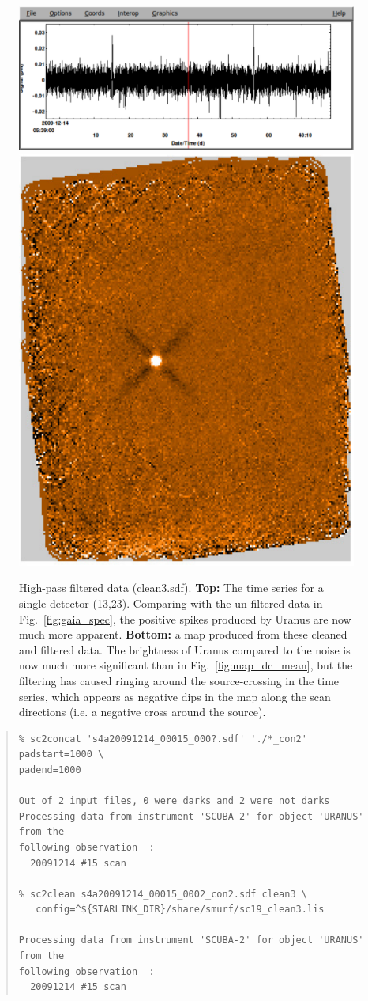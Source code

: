 \documentclass[twoside,11pt]{article}
\renewcommand{\_}{\texttt{\symbol{95}}}
\newenvironment{myquote}{\begin{quote}\begin{small}}{\end{small}\end{quote}}
\begin{document}
\begin{figure}
\begin{center}
\includegraphics[width=\linewidth]{sc19_spec_filt} \\
\vspace{0.3in}
\includegraphics[width=0.5\linewidth]{sc19_map_highpass}
\caption{High-pass filtered data (clean3.sdf). {\bf Top:} The time
  series for a single detector (13,23). Comparing with the un-filtered
  data in Fig.~\ref{fig:gaia_spec}, the positive spikes produced by
  Uranus are now much more apparent. {\bf Bottom:} a map produced from
  these cleaned and filtered data. The brightness of Uranus compared
  to the noise is now much more significant than in
  Fig.~\ref{fig:map_dc_mean}, but the filtering has caused ringing
  around the source-crossing in the time series, which appears as
  negative dips in the map along the scan directions (i.e. a negative
  cross around the source).}
\label{fig:highpass}
\end{center}
\end{figure}

\begin{myquote}
\begin{verbatim}
% sc2concat 's4a20091214_00015_000?.sdf' './*_con2' padstart=1000 \
padend=1000

Out of 2 input files, 0 were darks and 2 were not darks
Processing data from instrument 'SCUBA-2' for object 'URANUS' from the
following observation  :
  20091214 #15 scan

% sc2clean s4a20091214_00015_0002_con2.sdf clean3 \
   config=^${STARLINK_DIR}/share/smurf/sc19_clean3.lis

Processing data from instrument 'SCUBA-2' for object 'URANUS' from the
following observation  :
  20091214 #15 scan

\end{verbatim}
\end{myquote}
\end{document}

